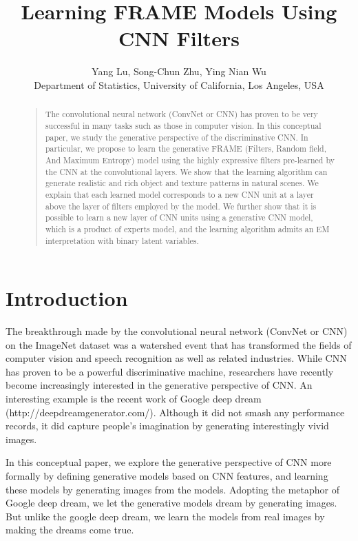 \documentclass[letterpaper]{article}
\begin{document}
\title{Learning FRAME Models Using CNN Filters}
\author{Yang Lu, Song-Chun Zhu, Ying Nian Wu\\
	Department of Statistics, University of California, Los Angeles, USA
}
\maketitle
\begin{abstract}
\begin{quote}
The convolutional neural network (ConvNet or CNN) has proven to be very successful in many tasks such as those  in computer vision. In this conceptual paper, we study the generative perspective of the discriminative CNN. In particular, we propose to learn the generative FRAME (Filters, Random field, And Maximum Entropy) model using the highly expressive filters pre-learned by the CNN at the convolutional layers. We show that the learning algorithm can generate  realistic and rich object and texture patterns in natural scenes. We explain that each learned model corresponds to a new CNN unit at a layer above the layer of filters employed by the model. We further show that it is possible to learn a new layer of CNN units using a generative CNN model, which is a product of experts model, and the learning algorithm admits an EM interpretation with binary latent variables. 
\end{quote}
\end{abstract}

\section{Introduction}

The breakthrough made by the convolutional neural network (ConvNet or CNN)  \citep{krizhevsky2012imagenet, lecun1998gradient} on the ImageNet dataset \citep{deng2009imagenet} was a watershed event that has transformed the fields of computer vision and speech recognition as well as related industries. While CNN has proven to be a powerful discriminative machine, researchers have recently become increasingly interested in the generative perspective of CNN. An interesting example is the recent work of Google deep dream (http://deepdreamgenerator.com/). Although it did not smash any performance records, it did capture people's imagination by generating interestingly vivid images. 

In this conceptual paper, we explore the generative perspective of CNN more formally by defining generative models based on CNN features, and learning these models by generating images  from the models. Adopting the metaphor of Google deep dream, we let the generative models dream by generating images. But unlike the google deep dream, we learn the models from real images by making the dreams come true. 
\end{document}
